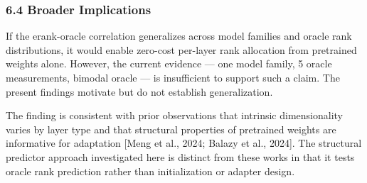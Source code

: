 \subsubsection{6.4 Broader Implications}

If the erank-oracle correlation generalizes across model families and oracle rank distributions, it would enable zero-cost per-layer rank allocation from pretrained weights alone. However, the current evidence --- one model family, 5 oracle measurements, bimodal oracle --- is insufficient to support such a claim. The present findings motivate but do not establish generalization.

The finding is consistent with prior observations that intrinsic dimensionality varies by layer type \citep{Aghajanyan2021Intrinsic} and that structural properties of pretrained weights are informative for adaptation [Meng et al., 2024; Balazy et al., 2024]. The structural predictor approach investigated here is distinct from these works in that it tests oracle rank prediction rather than initialization or adapter design.

